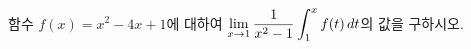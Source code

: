 함수 $f(x)=x^2-4x+1$에 대하여 $\displaystyle\lim_{x\to 1}\dfrac{1}{x^2-1}\int_{1}^{x} f(t)\mkern3mu dt$의 값을 구하시오.
